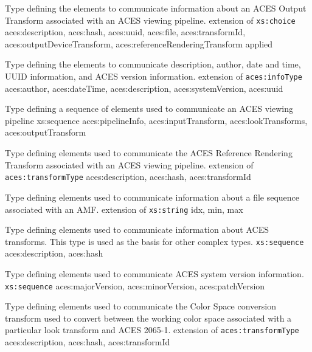                 {Type defining the elements to communicate information about an ACES Output Transform associated with an ACES viewing pipeline.}
                {extension of \texttt{xs:choice}}
                {aces:description, aces:hash, aces:uuid, aces:file, aces:transformId, \\ aces:outputDeviceTransform, aces:referenceRenderingTransform}
                {applied}

            {Type defining the elements to communicate description, author, date and time, UUID information, and ACES version information.}
            {extension of \texttt{aces:infoType}}
            {aces:author, aces:dateTime, aces:description, aces:systemVersion, aces:uuid}
            
            {Type defining a sequence of elements used to communicate an ACES viewing pipeline}
            {xs:sequence}
            {aces:pipelineInfo, aces:inputTransform, aces:lookTransforms,\\ aces:outputTransform}
 
            {Type defining elements used to communicate the ACES Reference Rendering Transform associated with an ACES viewing pipeline.}
            {extension of \texttt{aces:transformType}}
            {aces:description, aces:hash, aces:transformId}

                {Type defining elements used to communicate information about a file sequence associated with an AMF.}
                {extension of \texttt{xs:string}}
                {idx, min, max}

            {Type defining elements used to communicate information about ACES transforms.  This type is used as the basis for other complex types.}
            {\texttt{xs:sequence}}
            {aces:description, aces:hash}

            {Type defining elements used to communicate ACES system version information.}
            {\texttt{xs:sequence}}
            {aces:majorVersion, aces:minorVersion, aces:patchVersion}

            {Type defining elements used to communicate the Color Space conversion transform used to convert between the working color space associated with a particular look transform and ACES 2065-1.}
            {extension of \texttt{aces:transformType}}
            {aces:description, aces:hash, aces:transformId}
